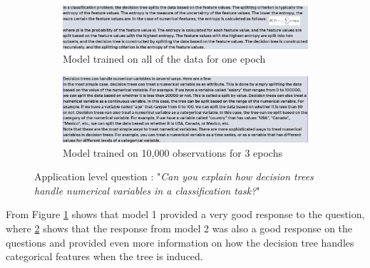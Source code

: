 \documentclass[10pt]{article}
\begin{document}
\begin{figure}[htbp]
    \centering
    \begin{subfigure}[b]{0.45\textwidth}
        \centering
        \includegraphics[width=\textwidth]{Images/1EpochQ2.png}
        \caption{Model trained on all of the data for one epoch}
        \label{fig: Q2_Model1}
    \end{subfigure}
    \hfill
    \begin{subfigure}[b]{0.5\textwidth}
        \centering
        \includegraphics[width=\textwidth]{Images/10kQ2.png}
        \caption{Model trained on 10,000 observations for 3 epochs}
        \label{fig: Q2_Model2}
    \end{subfigure}
    \caption{Application level question : "\textit{Can you explain how decision trees handle numerical variables in a classification task?}"}
    \label{fig: Q2}
\end{figure}
From Figure \ref{fig: Q2_Model1} shows that model 1 provided a very good response
to the question, where \ref{fig: Q2_Model2} shows that the response from model
2 was also a good response on the questions and provided even more information
on how the decision tree handles categorical features when the tree is induced.
\end{document}
